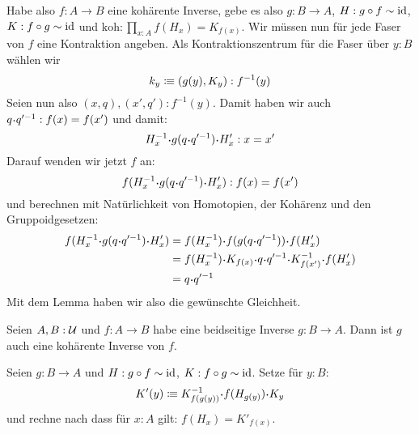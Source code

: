 \begin{beweis}
  Habe also $f:A\to B$ eine kohärente Inverse, gebe es also $g:B\to A$, $H:g\circ f\sim \mathrm{id}$, $K:f\circ g \sim \mathrm{id}$ und $\mathrm{koh} : \prod_{x:A}f(H_x)=K_{f(x)}$.
  Wir müssen nun für jede Faser von $f$ eine Kontraktion angeben.
  Als Kontraktionszentrum für die Faser über $y:B$ wählen wir
  \[
    k_y\vcentcolon\mspace{-1.2mu}\equiv (g(y), K_y) : f^{-1}(y)
  \]
  Seien nun also $(x,q),(x',q'):f^{-1}(y)$. Damit haben wir auch $q\kon q'^{-1}:f(x)=f(x')$ und damit:
  \[
    H_x^{-1}\kon g(q\kon q'^{-1}) \kon H_x':x=x'
  \]
  Darauf wenden wir jetzt $f$ an:
  \[
    f(H_x^{-1}\kon g(q\kon q'^{-1}) \kon H_x'):f(x)=f(x')
  \]
  und berechnen mit Natürlichkeit von Homotopien, der Kohärenz und den Gruppoidgesetzen:
  \begin{align*}
    f(H_x^{-1}\kon g(q\kon q'^{-1}) \kon H_x')&=f(H_x^{-1})\kon f(g(q\kon q'^{-1})) \kon f(H_x') \\
                                              &=f(H_x^{-1})\kon K_{f(x)}\kon q\kon q'^{-1}\kon K_{f(x')}^{-1} \kon f(H_x') \\
                                              &=q\kon q'^{-1}
  \end{align*}
  Mit dem Lemma haben wir also die gewünschte Gleichheit.
\end{beweis}

\begin{bemerkung}
  Seien $A,B:\mathcal{U}$ und $f:A\to B$ habe eine beidseitige Inverse $g:B\to A$.
  Dann ist $g$ auch eine kohärente Inverse von $f$.
\end{bemerkung}
\begin{beweis}
  Seien $g:B\to A$ und $H:g\circ f\sim\mathrm{id}$, $K:f\circ g\sim \mathrm{id}$. Setze für $y:B$:
  \[
    K'(y) \colonequiv K_{f(g(y))}^{-1}\kon f(H_{g(y)})\kon K_{y}
  \]
  und rechne nach dass für $x:A$ gilt: $f(H_x)=K'_{f(x)}$.
\end{beweis}

